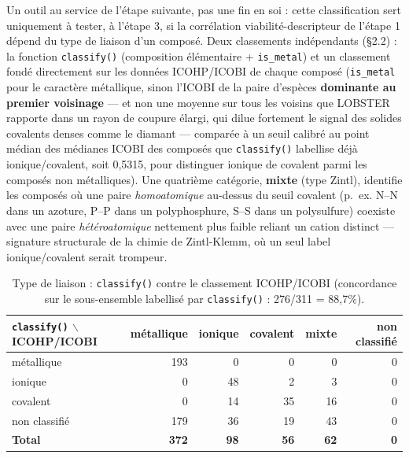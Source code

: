 \documentclass[11pt,a4paper]{article}
\begin{document}
Un outil au service de l'étape suivante, pas une fin en soi : cette
classification sert uniquement à tester, à l'étape 3, si la corrélation
viabilité-descripteur de l'étape 1 dépend du type de liaison d'un
composé. Deux classements indépendants (\S2.2) : la fonction
\texttt{classify()} (composition élémentaire + \texttt{is\_metal}) et un
classement fondé directement sur les données ICOHP/ICOBI de chaque
composé (\texttt{is\_metal} pour le caractère métallique, sinon l'ICOBI
de la paire d'espèces \textbf{dominante au premier voisinage} --- et non
une moyenne sur tous les voisins que LOBSTER rapporte dans un rayon de
coupure élargi, qui dilue fortement le signal des solides covalents
denses comme le diamant --- comparée à un seuil calibré au point médian
des médianes ICOBI des composés que \texttt{classify()} labellise déjà
ionique/covalent, soit 0,5315, pour distinguer ionique de covalent
parmi les composés non métalliques). Une quatrième catégorie,
\textbf{mixte} (type Zintl), identifie les composés où une paire
\emph{homoatomique} au-dessus du seuil covalent (p.~ex. N--N dans un
azoture, P--P dans un polyphosphure, S--S dans un polysulfure) coexiste
avec une paire \emph{hétéroatomique} nettement plus faible reliant un
cation distinct --- signature structurale de la chimie de Zintl-Klemm,
où un seul label ionique/covalent serait trompeur.

\begin{table}[htbp]
\centering
\caption{Type de liaison : \texttt{classify()} contre le classement ICOHP/ICOBI (concordance sur le sous-ensemble labellisé par \texttt{classify()} : 276/311 = 88,7\%).}
\label{tab:bondtype}
\begin{tabular}{@{}lrrrrr@{}}
\toprule
\texttt{classify()} $\backslash$ ICOHP/ICOBI & métallique & ionique & covalent & mixte & non classifié \\
\midrule
métallique     & 193 & 0  & 0  & 0 & 0 \\
ionique        & 0   & 48 & 2  & 3 & 0 \\
covalent       & 0   & 14 & 35 & 16 & 0 \\
non classifié  & 179 & 36 & 19 & 43 & 0 \\
\midrule
\textbf{Total} & \textbf{372} & \textbf{98} & \textbf{56} & \textbf{62} & \textbf{0} \\
\bottomrule
\end{tabular}
\end{table}
\end{document}
